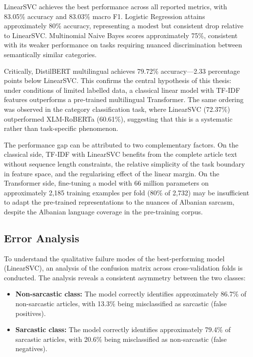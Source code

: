 \documentclass[12pt,a4paper]{article}
\begin{document}
LinearSVC achieves the best performance across all reported metrics, with 83.05\% accuracy and 83.03\% macro F1. Logistic Regression attains approximately 80\% accuracy, representing a modest but consistent drop relative to LinearSVC. Multinomial Naive Bayes scores approximately 75\%, consistent with its weaker performance on tasks requiring nuanced discrimination between semantically similar categories.

Critically, DistilBERT multilingual achieves 79.72\% accuracy---2.33 percentage points below LinearSVC. This confirms the central hypothesis of this thesis: under conditions of limited labelled data, a classical linear model with TF-IDF features outperforms a pre-trained multilingual Transformer. The same ordering was observed in the category classification task, where LinearSVC (72.37\%) outperformed XLM-RoBERTa (60.61\%), suggesting that this is a systematic rather than task-specific phenomenon.

The performance gap can be attributed to two complementary factors. On the classical side, TF-IDF with LinearSVC benefits from the complete article text without sequence length constraints, the relative simplicity of the task boundary in feature space, and the regularising effect of the linear margin. On the Transformer side, fine-tuning a model with 66 million parameters on approximately 2,185 training examples per fold (80\% of 2,732) may be insufficient to adapt the pre-trained representations to the nuances of Albanian sarcasm, despite the Albanian language coverage in the pre-training corpus.

\subsection{Error Analysis}
\label{subsec:error_analysis}

To understand the qualitative failure modes of the best-performing model (LinearSVC), an analysis of the confusion matrix across cross-validation folds is conducted. The analysis reveals a consistent asymmetry between the two classes:

\begin{itemize}[itemsep=0.3em]
    \item \textbf{Non-sarcastic class:} The model correctly identifies approximately 86.7\% of non-sarcastic articles, with 13.3\% being misclassified as sarcastic (false positives).
    \item \textbf{Sarcastic class:} The model correctly identifies approximately 79.4\% of sarcastic articles, with 20.6\% being misclassified as non-sarcastic (false negatives).
\end{itemize}
\end{document}
